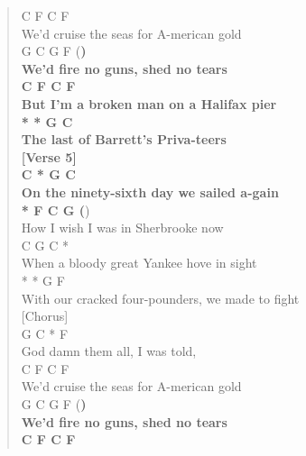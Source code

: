 \documentclass[11pt]{article}
\begin{document}
\begin{verse}
\hspace*{5em}C          F          C       F\\
We'd cruise the seas for A-merican gold\\
\hspace*{5em}G       C     G       F     (\textbf{)\\
We'd fire no guns, shed no tears\\
\hspace*{10em}C      F        C       F\\
But I'm a broken man on a Halifax pier\\
\hspace*{4em}*       *         G     C\\
The last of Barrett's Priva-teers\\
\vspace*{1em}
[Verse 5]\\
\hspace*{7em}C            *      G        C\\
On the ninety-sixth day we sailed a-gain\\
\hspace*{6em}*      F      C          G    (})\\
How I wish I was in Sherbrooke now\\
\hspace*{7em}C            G      C       *\\
When a bloody great Yankee hove in sight\\
\hspace*{9em}*            *            G       F\\
With our cracked four-pounders, we made to fight\\
\vspace*{1em}
[Chorus]\\
\hspace*{4em}G         C    *     F\\
God damn them all, I was told,\\
\hspace*{5em}C          F          C       F\\
We'd cruise the seas for A-merican gold\\
\hspace*{5em}G       C     G       F     (\textbf{)\\
We'd fire no guns, shed no tears\\
\hspace*{10em}C      F        C       F\\
}
\end{verse}
\end{document}
